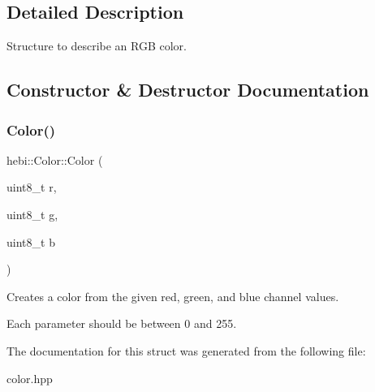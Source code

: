 \subsection{Detailed Description}
Structure to describe an R\+GB color. 

\subsection{Constructor \& Destructor Documentation}
\mbox{\label{structhebi_1_1Color_aa7cad37a99b993eea058d455bbcc4a82}} 
\subsubsection{\texorpdfstring{Color()}{Color()}}
{\footnotesize\ttfamily hebi\+::\+Color\+::\+Color (\begin{DoxyParamCaption}\item[{uint8\+\_\+t}]{r,  }\item[{uint8\+\_\+t}]{g,  }\item[{uint8\+\_\+t}]{b }\end{DoxyParamCaption})\hspace{0.3cm}{\ttfamily [inline]}}



Creates a color from the given red, green, and blue channel values. 

Each parameter should be between 0 and 255. 

The documentation for this struct was generated from the following file\+:\begin{DoxyCompactItemize}
\item 
color.\+hpp\end{DoxyCompactItemize}
